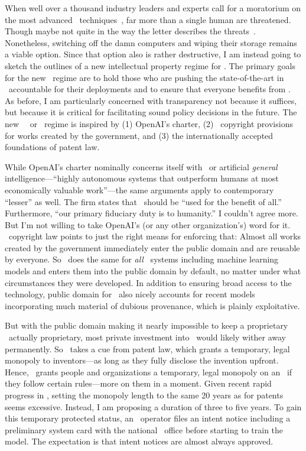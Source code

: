 When well over a thousand industry leaders and experts call for a moratorium on
the most advanced \AI\ techniques~\cite{MetzSchmidt2023}, far more than a single
human are threatened. Though maybe not quite in the way the letter describes the
threats~\cite{KapoorNarayanan2023}. Nonetheless, switching off the damn
computers and wiping their storage remains a viable option. Since that option
also is rather destructive, I am instead going to sketch the outlines of a new
intellectual property regime for \AI. The primary goals for the new \IP\ regime
are to hold those who are pushing the state-of-the-art in \AI\ accountable for
their deployments and to ensure that everyone benefits from \AI. As before, I am
particularly concerned with transparency not because it suffices, but because it
is critical for facilitating sound policy decisions in the future. The new \AI\
\IP\ or \AIP\ regime is inspired by (1) OpenAI's charter, (2) \US\ copyright
provisions for works created by the government, and (3) the internationally
accepted foundations of patent law.

While OpenAI's charter nominally concerns itself with \AGI\ or artificial
\emph{general} intelligence---``highly autonomous systems that outperform humans
at most economically valuable work''---the same arguments apply to contemporary
``lesser'' \AI as well. The firm states that \AI\ should be ``used for the
benefit of all.'' Furthermore, ``our primary fiduciary duty is to humanity.'' I
couldn't agree more. But I'm not willing to take OpenAI's (or any other
organization's) word for it. \US\ copyright law points to just the right means
for enforcing that: Almost all works created by the government immediately enter
the public domain and are reusable by everyone. So \AIP\ does the same for
\emph{all} \AI\ systems including machine learning models and enters them into
the public domain by default, no matter under what circumstances they were
developed. In addition to ensuring broad access to the technology, public domain
for \AI\ also nicely accounts for recent models incorporating much material of
dubious provenance, which is plainly exploitative.

But with the public domain making it nearly impossible to keep a proprietary
\AI\ actually proprietary, most private investment into \AI\ would likely wither
away permanently. So \AIP\ takes a cue from patent law, which grants a
temporary, legal monopoly to inventors---as long as they fully disclose the
invention upfront. Hence, \AIP\ grants people and organizations a temporary,
legal monopoly on an \AI\ if they follow certain rules---more on them in a
moment. Given recent rapid progress in \AI, setting the monopoly length to the
same 20 years as for patents seems excessive. Instead, I am proposing a duration
of three to five years. To gain this temporary protected status, an \AI\
operator files an intent notice including a preliminary system card with the
national \AIP\ office before starting to train the model. The expectation is
that intent notices are almost always approved.

